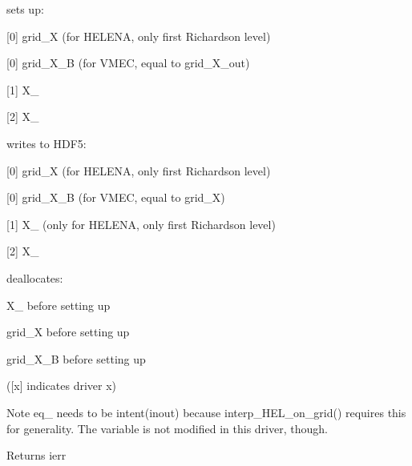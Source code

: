 \begin{DoxyItemize}
\item sets up\+:
\begin{DoxyItemize}
\item \mbox{[}0\mbox{]} {\ttfamily grid\+\_\+X} (for H\+E\+L\+E\+NA, only first Richardson level)
\item \mbox{[}0\mbox{]} {\ttfamily grid\+\_\+\+X\+\_\+B} (for V\+M\+EC, equal to grid\+\_\+\+X\+\_\+out)
\item \mbox{[}1\mbox{]} {\ttfamily X\+\_} 
\item \mbox{[}2\mbox{]} {\ttfamily X\+\_} 
\end{DoxyItemize}
\item writes to H\+D\+F5\+:
\begin{DoxyItemize}
\item \mbox{[}0\mbox{]} {\ttfamily grid\+\_\+X} (for H\+E\+L\+E\+NA, only first Richardson level)
\item \mbox{[}0\mbox{]} {\ttfamily grid\+\_\+\+X\+\_\+B} (for V\+M\+EC, equal to grid\+\_\+X)
\item \mbox{[}1\mbox{]} {\ttfamily X\+\_} (only for H\+E\+L\+E\+NA, only first Richardson level)
\item \mbox{[}2\mbox{]} {\ttfamily X\+\_} 
\end{DoxyItemize}
\item deallocates\+:
\begin{DoxyItemize}
\item {\ttfamily X\+\_} before setting up
\item {\ttfamily grid\+\_\+X} before setting up
\item {\ttfamily grid\+\_\+\+X\+\_\+B} before setting up
\end{DoxyItemize}
\end{DoxyItemize}

(\mbox{[}x\mbox{]} indicates driver x)

\begin{DoxyNote}{Note}
{\ttfamily eq\+\_} needs to be intent(inout) because interp\+\_\+\+H\+E\+L\+\_\+on\+\_\+grid() requires this for generality. The variable is not modified in this driver, though.
\end{DoxyNote}
\begin{DoxyReturn}{Returns}
ierr
\end{DoxyReturn}

